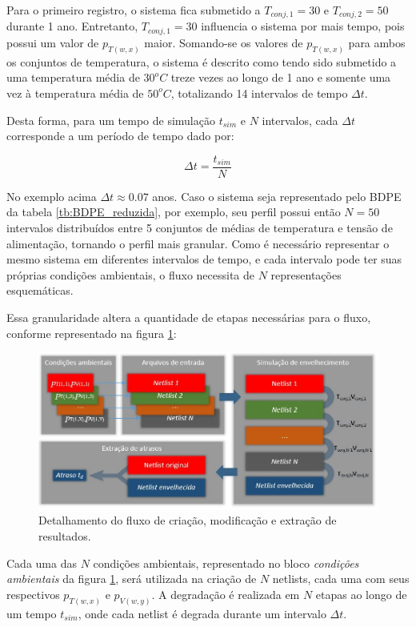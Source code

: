 Para o primeiro registro, o sistema fica submetido a $T_{conj,1}=30$ e $T_{conj,2}=50$ durante 1 ano. Entretanto, $T_{conj,1}=30$ influencia o sistema por mais tempo, pois possui um valor de $p_{T(w,x)}$ maior. Somando-se os valores de $p_{T(w,x)}$ para ambos os conjuntos de temperatura, o sistema é descrito como tendo sido submetido a uma temperatura média de $30^{o}C$ treze vezes ao longo de 1 ano e somente uma vez à temperatura média de $50^{o}C$, totalizando 14 intervalos de tempo $\Delta t$.

Desta forma, para um tempo de simulação $t_{sim}$ e $N$ intervalos, cada $\Delta t$ corresponde a um período de tempo dado por:

\begin{equation}
\Delta t = \frac{t_{sim}}{N}
\end{equation}

No exemplo acima $\Delta t\approx 0.07$ anos. Caso o sistema seja representado pelo BDPE da tabela \ref{tb:BDPE_reduzida}, por exemplo, seu perfil possui então $N=50$ intervalos distribuídos entre 5 conjuntos de médias de temperatura e tensão de alimentação, tornando o perfil mais granular. Como é necessário representar o mesmo sistema em diferentes intervalos de tempo, e cada intervalo pode ter suas próprias condições ambientais, o fluxo necessita de $N$ representações esquemáticas.

Essa granularidade altera a quantidade de etapas necessárias para o fluxo, conforme representado na figura \ref{figure:fluxo_detalhado}:

\begin{figure}[H]
	\center
	\includegraphics[width=1\textwidth]{images/fluxo_detalhado}
	\caption{Detalhamento do fluxo de criação, modificação e extração de resultados.}
	\label{figure:fluxo_detalhado}
\end{figure}

Cada uma das $N$ condições ambientais, representado no bloco \textit{condições ambientais} da figura \ref{figure:fluxo_detalhado}, será utilizada na criação de $N$ netlists, cada uma com seus respectivos $p_{T(w,x)}$ e $p_{V(w,y)}$. A degradação é realizada em $N$ etapas ao longo de um tempo $t_{sim}$, onde cada netlist é degrada durante um intervalo $\Delta t$.

